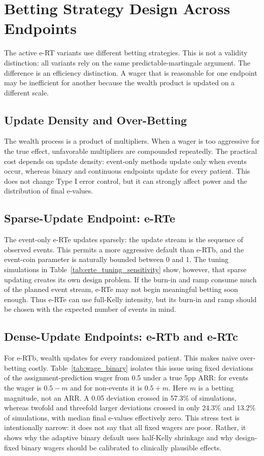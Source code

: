 \documentclass[10pt]{article}
\begin{document}
\section{Betting Strategy Design Across Endpoints}

The active e-RT variants use different betting strategies. This is not a validity distinction: all variants rely on the same predictable-martingale argument. The difference is an efficiency distinction. A wager that is reasonable for one endpoint may be inefficient for another because the wealth product is updated on a different scale.

\subsection{Update Density and Over-Betting}

The wealth process is a product of multipliers. When a wager is too aggressive for the true effect, unfavorable multipliers are compounded repeatedly. The practical cost depends on update density: event-only methods update only when events occur, whereas binary and continuous endpoints update for every patient. This does not change Type I error control, but it can strongly affect power and the distribution of final e-values.

\subsection{Sparse-Update Endpoint: e-RTe}

The event-only e-RTe updates sparsely: the update stream is the sequence of observed events. This permits a more aggressive default than e-RTb, and the event-coin parameter is naturally bounded between 0 and 1. The tuning simulations in Table~\ref{tab:erte_tuning_sensitivity} show, however, that sparse updating creates its own design problem. If the burn-in and ramp consume much of the planned event stream, e-RTe may not begin meaningful betting soon enough. Thus e-RTe can use full-Kelly intensity, but its burn-in and ramp should be chosen with the expected number of events in mind.

\subsection{Dense-Update Endpoints: e-RTb and e-RTc}

For e-RTb, wealth updates for every randomized patient. This makes naive over-betting costly. Table~\ref{tab:wage_binary} isolates this issue using fixed deviations of the assignment-prediction wager from 0.5 under a true 5pp ARR: for events the wager is $0.5-m$ and for non-events it is $0.5+m$. Here $m$ is a betting magnitude, not an ARR. A 0.05 deviation crossed in 57.3\% of simulations, whereas twofold and threefold larger deviations crossed in only 24.3\% and 13.2\% of simulations, with median final e-values effectively zero. This stress test is intentionally narrow: it does not say that all fixed wagers are poor. Rather, it shows why the adaptive binary default uses half-Kelly shrinkage and why design-fixed binary wagers should be calibrated to clinically plausible effects.
\end{document}
